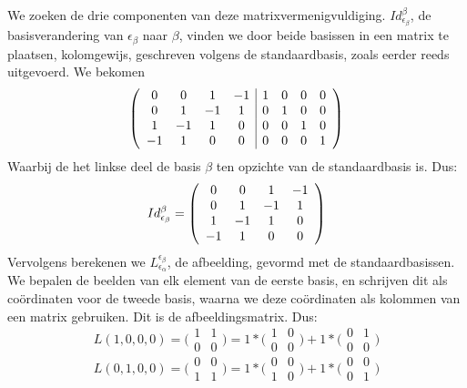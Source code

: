\documentclass[lineaire_algebra_oplossingen.tex]{subfiles}
\begin{document}
We zoeken de drie componenten van deze matrixvermenigvuldiging. $Id^\beta_{\epsilon_\beta}$, de basisverandering van $\epsilon_\beta$ naar $\beta$, vinden we door beide basissen in een matrix te plaatsen, kolomgewijs, geschreven volgens de standaardbasis, zoals eerder reeds uitgevoerd. We bekomen
\[
\left(
\begin{array}{c c c c | c c c c}
0 & 0 & 1 & -1 & 1 & 0 & 0 & 0 \\ 
0 & 1 & -1 & 1 & 0 & 1 & 0 & 0 \\ 
1 & -1 & 1 & 0 & 0 & 0 & 1 & 0 \\ 
-1 & 1 & 0 & 0 & 0 & 0 & 0 & 1 \\ 
\end{array}
\right)
\]
Waarbij de het linkse deel de basis $\beta$ ten opzichte van de standaardbasis is. Dus:
\[Id^\beta_{\epsilon_\beta} = \left(
\begin{array}{c c c c}
0 & 0 & 1 & -1 \\ 
0 & 1 & -1 & 1 \\ 
1 & -1 & 1 & 0 \\ 
-1 & 1 & 0 & 0 \\ 
\end{array}
\right)
\]
Vervolgens berekenen we $L^{\epsilon_\beta}_{\epsilon_\alpha}$, de afbeelding, gevormd met de standaardbasissen. We bepalen de beelden van elk element van de eerste basis, en schrijven dit als co\"ordinaten voor de tweede basis, waarna we deze co\"ordinaten als kolommen van een matrix gebruiken. Dit is de afbeeldingsmatrix. Dus:
\[L(1,0,0,0)=\bigl(\begin{smallmatrix} 1&1\\ 0&0 \end{smallmatrix} \bigr) = 1*\bigl(\begin{smallmatrix} 1&0\\ 0&0 \end{smallmatrix} \bigr) + 1*\bigl(\begin{smallmatrix} 0&1\\ 0&0 \end{smallmatrix} \bigr)\]
\[L(0,1,0,0)=\bigl(\begin{smallmatrix}0&0\\ 1&1 \end{smallmatrix} \bigr) = 1*\bigl(\begin{smallmatrix} 0&0\\ 1&0 \end{smallmatrix} \bigr) + 1*\bigl(\begin{smallmatrix} 0&0\\ 0&1 \end{smallmatrix} \bigr)\]
\end{document}
